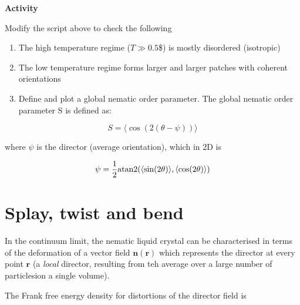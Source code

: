 \documentclass[
  letterpaper,
  enabledeprecatedfontcommands]{report}
\providecommand{\tightlist}{%
  \setlength{\itemsep}{0pt}\setlength{\parskip}{0pt}}
\begin{document}
\begin{tcolorbox}[enhanced jigsaw, breakable, colframe=quarto-callout-important-color-frame, colback=white, arc=.35mm, left=2mm, leftrule=.75mm, bottomrule=.15mm, rightrule=.15mm, toprule=.15mm, opacityback=0]
\begin{minipage}[t]{5.5mm}
\textcolor{quarto-callout-important-color}{\faExclamation}
\end{minipage}%
\begin{minipage}[t]{\textwidth - 5.5mm}

\vspace{-3mm}\textbf{Activity}\vspace{3mm}

Modify the script above to check the following

\begin{enumerate}
\def\labelenumi{\arabic{enumi}.}
\tightlist
\item
  The high temperature regime (\(T\gg 0.5\)\$) is mostly disordered
  (isotropic)
\item
  The low temperature regime forms larger and larger patches with
  coherent orientations
\item
  Define and plot a global nematic order parameter. Τhe global nematic
  order parameter S is defined as:
\end{enumerate}

\[ S = \langle \cos(2(\theta - \psi))\rangle\]

where \(\psi\) is the director (average orientation), which in 2D is

\[\psi = \dfrac{1}{2} {\rm atan2}(\langle \sin(2\theta)\rangle, \langle \cos(2\theta)\rangle)\]

\end{minipage}%
\end{tcolorbox}

\section{Splay, twist and bend}\label{splay-twist-and-bend}

In the continuum limit, the nematic liquid crystal can be characterised
in terms of the deformation of a vector field \(\mathbf{n}(\mathbf{r})\)
which represents the director at every point \(\mathbf{r}\) (a
\emph{local} director, resulting from teh average over a large number of
particlesion a single volume).

The Frank free energy density for distortions of the director field is
\end{document}
